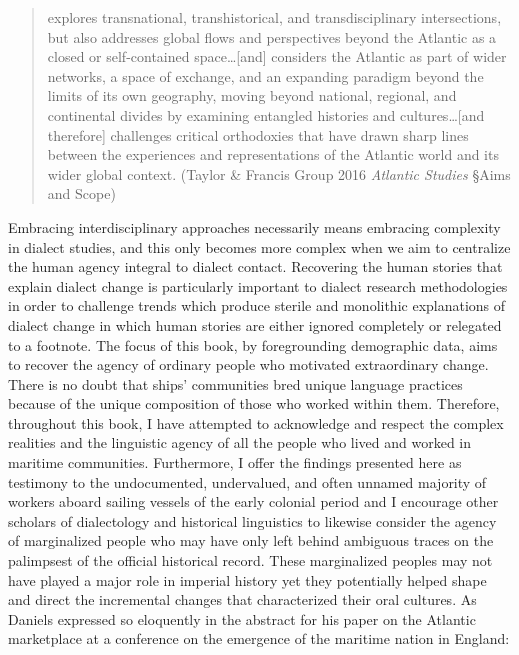 \begin{quotation}
explores transnational, transhistorical, and transdisciplinary intersections, but also addresses global flows and perspectives beyond the Atlantic as a closed or self-contained space…[and] considers the Atlantic as part of wider networks, a space of exchange, and an expanding paradigm beyond the limits of its own geography, moving beyond national, regional, and continental divides by examining entangled histories and cultures…[and therefore] challenges critical orthodoxies that have drawn sharp lines between the experiences and representations of the Atlantic world and its wider global context. (Taylor \& Francis Group 2016 \textit{Atlantic Studies} §Aims and Scope)

\end{quotation}
\begin{styleStandard}
Embracing interdisciplinary approaches necessarily means embracing complexity in dialect studies, and this only becomes more complex when we aim to centralize the human agency integral to dialect contact. Recovering the human stories that explain dialect change is particularly important to dialect research methodologies in order to challenge trends which produce sterile and monolithic explanations of dialect change in which human stories are either ignored completely or relegated to a footnote. The focus of this book, by foregrounding demographic data, aims to recover the agency of ordinary people who motivated extraordinary change. There is no doubt that ships’ communities bred unique language practices because of the unique composition of those who worked within them. Therefore, throughout this book, I have attempted to acknowledge and respect the complex realities and the linguistic agency of all the people who lived and worked in maritime communities. Furthermore, I offer the findings presented here as testimony to the undocumented, undervalued, and often unnamed majority of workers aboard sailing vessels of the early colonial period and I encourage other scholars of dialectology and historical linguistics to likewise consider the agency of marginalized people who may have only left behind ambiguous traces on the palimpsest of the official historical record. These marginalized peoples may not have played a major role in imperial history yet they potentially helped shape and direct the incremental changes that characterized their oral cultures. As Daniels expressed so eloquently in the abstract for his paper on the Atlantic marketplace at a conference on the emergence of the maritime nation in England:
\end{styleStandard}


